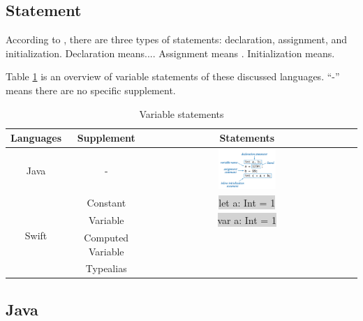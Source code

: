 \documentclass[12pt, a4paper]{report}
\begin{document}
    \subsection{Statement}
    According to \citep{javaCheetsheet}, there are three types of statements: declaration, assignment, and initialization. Declaration means.... Assignment means . Initialization means. \par 
    Table \ref{tab:statements} is an overview of variable statements of these discussed languages. ``-'' means there are no specific supplement. 
    \begin{table}[H]
        \centering
        \begin{tabular}{c|c|c|c}
            \toprule
             Languages & Supplement & Statements\\
             \hline
             Java & - & \includegraphics[width=0.3\textwidth]{imgs/assignment.png} \\
             \hline
             \multirow{4}{*}{Swift} & Constant & \colorbox{lightgray}{let a: Int = 1}\\
             & Variable & \colorbox{lightgray}{var a: Int = 1}\\
             & Computed Variable & \\
             & Typealias & \\
             \bottomrule
        \end{tabular}
        \caption{Variable statements}
        \label{tab:statements}
    \end{table}



    
    \subsection{Java}
\end{document}
